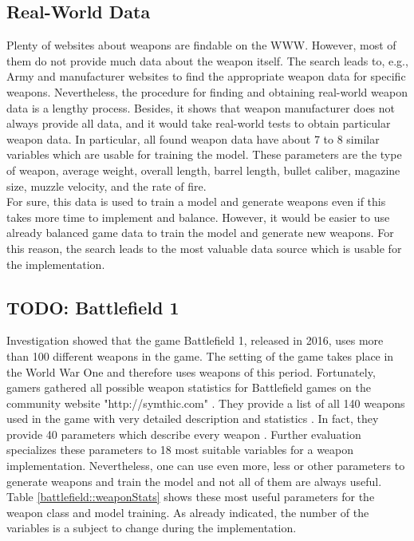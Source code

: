 \documentclass[MGS,Master,english]{twbook}%
\begin{document}
\subsection{Real-World Data}
Plenty of websites about weapons are findable on the \ac{WWW}. However, most of them do not provide much data about the weapon itself. The search leads to, e.g., Army and manufacturer websites to find the appropriate weapon data for specific weapons. Nevertheless, the procedure for finding and obtaining real-world weapon data is a lengthy process. Besides, it shows that weapon manufacturer does not always provide all data, and it would take real-world tests to obtain particular weapon data. In particular, all found weapon data have about 7 to 8 similar variables which are usable for training the model. These parameters are the type of weapon, average weight, overall length, barrel length, bullet caliber, magazine size, muzzle velocity, and the rate of fire.\\
For sure, this data is used to train a model and generate weapons even if this takes more time to implement and balance. However, it would be easier to use already balanced game data to train the model and generate new weapons. For this reason, the search leads to the most valuable data source which is usable for the implementation.

\subsection{TODO: Battlefield 1}
{\color{blue}Investigation showed that the game Battlefield 1, released in 2016, uses more than 100 different weapons in the game. The setting of the game takes place in the World War One and therefore uses weapons of this period. Fortunately, gamers gathered all possible weapon statistics for Battlefield games on the community website "http://symthic.com" \cite{symthic::bf1stats}. They provide a list of all 140 weapons used in the game with very detailed description and statistics \cite{symthic::bf1stats}. In fact, they provide 40 parameters which describe every weapon \cite{symthic::bf1stats}. Further evaluation specializes these parameters to 18 most suitable variables for a weapon implementation. Nevertheless, one can use even more, less or other parameters to generate weapons and train the model and not all of them are always useful. Table \ref{battlefield::weaponStats} shows these most useful parameters for the weapon class and model training. As already indicated, the number of the variables is a subject to change during the implementation.}
\end{document}
